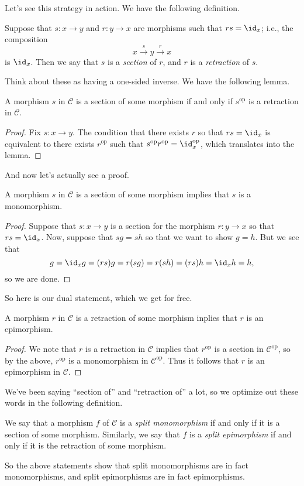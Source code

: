 Let's see this strategy in action. We have the following definition.
\begin{definition}
	Suppose that $s:x\to y$ and $r:y\to x$ are morphisms such that $rs=\id_x$; i.e., the composition
	\[x\stackrel s\to y\stackrel r\to x\]
	is $\id_x$. Then we say that $s$ is a \textit{section} of $r$, and $r$ is a \textit{retraction} of $s$.
\end{definition}
Think about these as having a one-sided inverse. We have the following lemma.
\begin{lemma}
	A morphism $s$ in $\mathcal C$ is a section of some morphism if and only if $s^\mathrm{op}$ is a retraction in $\mathcal C$.
\end{lemma}
\begin{proof}
	Fix $s:x\to y$. The condition that there exists $r$ so that $rs=\id_x$ is equivalent to there exists $r^\mathrm{op}$ such that $s^\mathrm{op}r^\mathrm{op}=\id_x^\mathrm{op}$, which translates into the lemma.
\end{proof}
And now let's actually see a proof.
\begin{proposition}
	A morphism $s$ in $\mathcal C$ is a section of some morphism implies that $s$ is a monomorphism.
\end{proposition}
\begin{proof}
	Suppose that $s:x\to y$ is a section for the morphism $r:y\to x$ so that $rs=\id_x$. Now, suppose that $sg=sh$ so that we want to show $g=h$. But we see that
	\[g=\id_xg=(rs)g=r(sg)=r(sh)=(rs)h=\id_xh=h,\]
	so we are done.
\end{proof}
So here is our dual statement, which we get for free.
\begin{proposition}
	A morphism $r$ in $\mathcal C$ is a retraction of some morphism inplies that $r$ is an epimorphism.
\end{proposition}
\begin{proof}
	We note that $r$ is a retraction in $\mathcal C$ implies that $r^\mathrm{op}$ is a section in $\mathcal C^\mathrm{op}$, so by the above, $r^\mathrm{op}$ is a monomorphism in $\mathcal C^\mathrm{op}$. Thus it follows that $r$ is an epimorphism in $\mathcal C$.
\end{proof}
We've been saying ``section of'' and ``retraction of'' a lot, so we optimize out these words in the following definition.
\begin{definition}
	We say that a morphism $f$ of $\mathcal C$ is a \textit{split monomorphism} if and only if it is a section of some morphism. Similarly, we say that $f$ is a \textit{split epimorphism} if and only if it is the retraction of some morphism.
\end{definition}
So the above statements show that split monomorphisms are in fact monomorphisms, and split epimorphisms are in fact epimorphisms.

